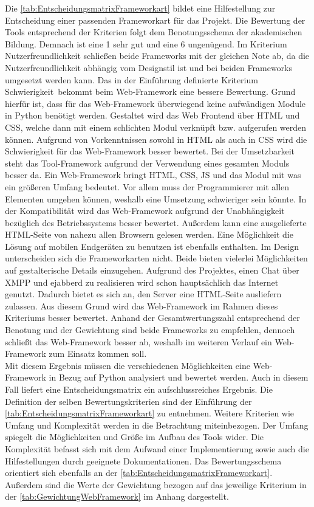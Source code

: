 \documentclass[a4paper,titlepage,halfparskip,12pt]{scrreprt}
\begin{document}
\begin{onehalfspacing}
Die \autoref{tab:EntscheidungsmatrixFrameworkart} bildet eine Hilfestellung zur Entscheidung einer passenden Frameworkart für das Projekt. Die Bewertung der Tools entsprechend der Kriterien folgt dem Benotungsschema der akademischen Bildung. Demnach ist eine 1 sehr gut und eine 6 ungenügend. Im Kriterium Nutzerfreundlichkeit schließen beide Frameworks mit der gleichen Note ab, da die Nutzerfreundlichkeit abhängig vom Designstil ist und bei beiden Frameworks umgesetzt werden kann. Das in der Einführung definierte Kriterium \glqq Schwierigkeit\grqq\, bekommt beim Web-Framework eine bessere Bewertung. Grund hierfür ist, dass für das Web-Framework überwiegend keine aufwändigen Module in Python benötigt werden. Gestaltet wird das Web Frontend über \ac{HTML} und \ac{CSS}, welche dann mit einem schlichten Modul verknüpft bzw. aufgerufen werden können. Aufgrund von Vorkenntnissen sowohl in \ac{HTML} als auch in \ac{CSS} wird die Schwierigkeit für das Web-Framework besser bewertet. Bei der Umsetzbarkeit steht das Tool-Framework aufgrund der Verwendung eines gesamten Moduls besser da. Ein Web-Framework bringt \ac{HTML}, \ac{CSS}, \ac{JS} und das Modul mit was ein größeren Umfang bedeutet. Vor allem muss der Programmierer mit allen Elementen umgehen können, weshalb eine Umsetzung schwieriger sein könnte. In der Kompatibilität wird das Web-Framework aufgrund der Unabhängigkeit bezüglich des Betriebssystems besser bewertet. Außerdem kann eine ausgelieferte \ac{HTML}-Seite von nahezu allen Browsern gelesen werden. Eine Möglichkeit die Lösung auf mobilen Endgeräten zu benutzen ist ebenfalls enthalten. Im Design unterscheiden sich die Frameworkarten nicht. Beide bieten vielerlei Möglichkeiten auf gestalterische Details einzugehen. Aufgrund des Projektes, einen Chat über \ac{XMPP} und ejabberd zu realisieren wird schon hauptsächlich das Internet genutzt. Dadurch bietet es sich an, den Server eine \ac{HTML}-Seite ausliefern zulassen. Aus diesem Grund wird das Web-Framework im Rahmen dieses Kriteriums besser bewertet. Anhand der Gesamtwertungszahl entsprechend der Benotung und der Gewichtung sind beide Frameworks zu empfehlen, dennoch schließt das Web-Framework besser ab, weshalb im weiteren Verlauf ein Web-Framework zum Einsatz kommen soll. \cite{FrameworkOverview} \cite{WebFramework}\\ 
Mit diesem Ergebnis müssen die verschiedenen Möglichkeiten eine Web-Framework in Bezug auf Python analysiert und bewertet werden. Auch in diesem Fall liefert eine Entscheidungsmatrix ein aufschlussreiches Ergebnis. Die Definition der selben Bewertungskriterien sind der Einführung der \autoref{tab:EntscheidungsmatrixFrameworkart} zu entnehmen. Weitere Kriterien wie Umfang und Komplexität werden in die Betrachtung miteinbezogen. Der Umfang spiegelt die Möglichkeiten und Größe im Aufbau des Tools wider. Die Komplexität befasst sich mit dem Aufwand einer Implementierung sowie auch die Hilfestellungen durch geeignete Dokumentationen. Das Bewertungsschema orientiert sich ebenfalls an der \autoref{tab:EntscheidungsmatrixFrameworkart}. Außerdem sind die Werte der Gewichtung bezogen auf das jeweilige Kriterium in der \autoref{tab:GewichtungWebFramework} im Anhang dargestellt.

\end{onehalfspacing}
\end{document}
